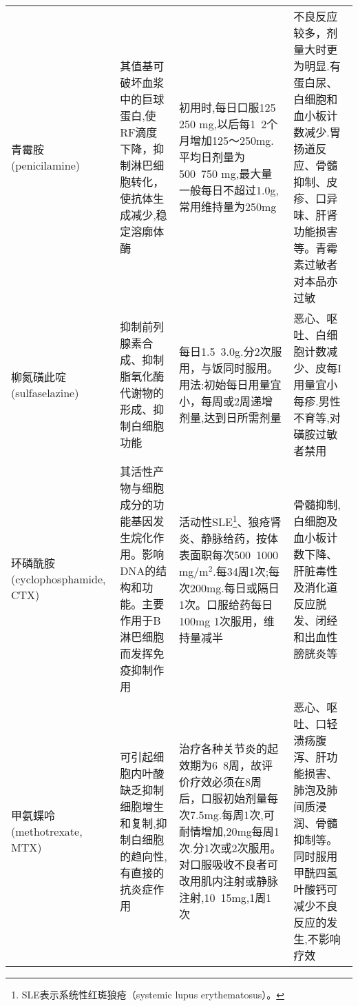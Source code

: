 \begin{longtable}[]{p{3cm}p{4cm}p{4cm}p{4cm}}
    青霉胺(penicilamine)                                                                                                                                                                       & 其值基可破坏血浆中的巨球蛋白,使RF滴度下降，抑制淋巴细胞转化，使抗体生成减少,稳定溶廓体酶                                                & 初用时,每日口服125~ 250 mg,以后每1~2个月增加125～250mg.平均日剂量为500~750 mg,最大量一般每日不超过1.0g,常用维持量为250mg                                                           & 不良反应较多，剂量大时更为明显.有蛋白尿、白细胞和血小板计数减少.胃扬道反应、骨髓抑制、皮疹、口异味、肝肾功能损害等。青霉素过敏者对本品亦过敏
    \\
    柳氮磺此啶(sulfaselazine)                                                                                                                                                                  & 抑制前列腺素合成、抑制脂氧化酶代谢物的形成、抑制白细胞功能                                                                              & 每日1.5~3.0g.分2次服用，与饭同时服用。用法:初始每日用量宜小，每周或2周递增剂量,达到日所需剂量                                                                                      & 恶心、呕吐、白细胞计数减少、皮每I用量宜小每疹.男性不育等,对磺胺过敏者禁用
    \\
    环磷酰胺(cyclophosphamide, CTX)                                                                                                                                                            & 其活性产物与细胞成分的功能基因发生烷化作用。影响DNA的结构和功能。主要作用于B淋巴细胞而发挥免疫抑制作用                                  & 活动性SLE\footnote{SLE表示系统性红斑狼疮（systemic lupus erythematosus）。}、狼疮肾炎、静脉给药，按体表面职每次500~1000 mg/m$^2$.每34周1次;每次200mg.每日或隔日1次。口服给药每日100mg 1次服用，维持量减半                                            & 骨髓抑制,白细胞及血小板计数下降、肝脏毒性及消化道反应脱发、闭经和出血性膀胱炎等
    \\
    甲氨蝶呤(methotrexate, MTX)                                                                                                                                                                & 可引起细胞内叶酸缺乏抑制细胞增生 和复制,抑制白细胞的趋向性,有直接的抗炎症作用                                                           & 治疗各种关节炎的起效期为6~8周，故评价疗效必须在8周后，口服初始剂量每次7.5mg.每周1次,可耐情增加,20mg每周1次.分1次或2次服用。对口服吸收不良者可改用肌内注射或静脉注射,10~15mg,1周1次 & 恶心、呕吐、口轻溃疡腹泻、肝功能损害、肺泡及肺间质浸润、骨髓抑制等。同时服用甲酰四氢叶酸钙可减少不良反应的发生,不影响疗效

\end{longtable}
